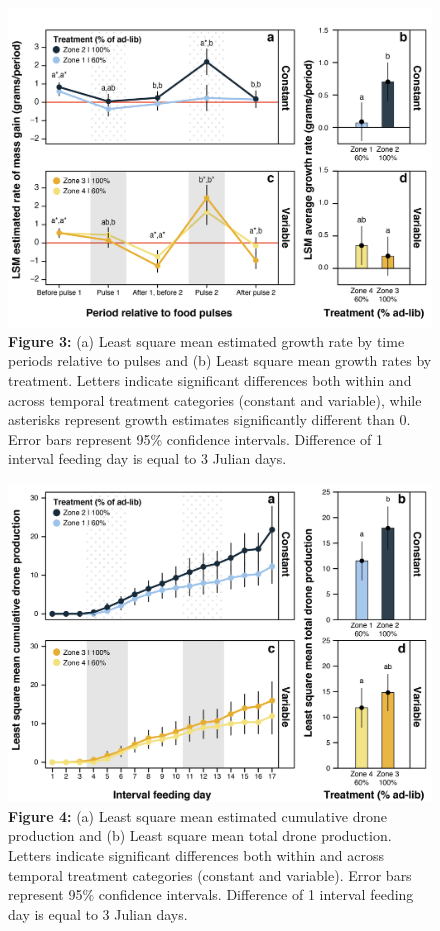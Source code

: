\documentclass[11pt,]{article}
\begin{document}
\begin{figure}
\centering
\includegraphics{./fig3_mc_growth.png}
\caption{\textbf{Figure 3:} (a) Least square mean estimated growth rate
by time periods relative to pulses and (b) Least square mean growth
rates by treatment. Letters indicate significant differences both within
and across temporal treatment categories (constant and variable), while
asterisks represent growth estimates significantly different than 0.
Error bars represent 95\% confidence intervals. Difference of 1 interval
feeding day is equal to 3 Julian days.}
\end{figure}

\begin{figure}
\centering
\includegraphics{./fig4_drones.png}
\caption{\textbf{Figure 4:} (a) Least square mean estimated cumulative
drone production and (b) Least square mean total drone production.
Letters indicate significant differences both within and across temporal
treatment categories (constant and variable). Error bars represent 95\%
confidence intervals. Difference of 1 interval feeding day is equal to 3
Julian days.}
\end{figure}
\end{document}
